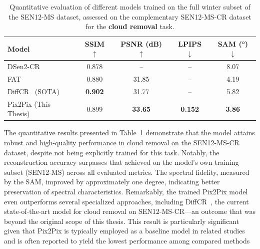 \begin{table}[h!]
    \centering
    \caption[Quantitative results on cloud removal]{Quantitative evaluation of different models trained on the full winter subset of the SEN12-MS dataset, assessed on the complementary SEN12-MS-CR dataset for the \textbf{cloud removal} task.}
    \begin{tabular}{lcccc}
        \toprule
        \textbf{Model}               & \textbf{SSIM $\uparrow$} & \textbf{PSNR (dB) $\uparrow$} & \textbf{LPIPS $\downarrow$} & \textbf{SAM (°) $\downarrow$} \\
        \midrule
        DSen2-CR~\cite{CR_SEN2_dRNN} & 0.878                    & --                            & --                          & 8.07                          \\
        FAT~\cite{c_guided_fus_s2ot} & 0.880                    & 31.85                         & --                          & 4.19                          \\
        DiffCR~\cite{DiffCR} (SOTA)  & \textbf{0.902}           & 31.77                         & --                          & 5.82                          \\
        Pix2Pix (This Thesis)        & 0.899                    & \textbf{33.65}                & \textbf{0.152}              & \textbf{3.86}                 \\
        \bottomrule
    \end{tabular}
    \label{tab:quantitative_result_cr}
\end{table}

The quantitative results presented in Table~\ref{tab:quantitative_result_cr} demonstrate that the model attains robust and high-quality performance in cloud removal on the SEN12-MS-CR dataset, despite not being explicitly trained for this task. Notably, the reconstruction accuracy surpasses that achieved on the model’s own training subset (SEN12-MS) across all evaluated metrics. The spectral fidelity, measured by the SAM, improved by approximately one degree, indicating better preservation of spectral characteristics. Remarkably, the trained Pix2Pix model even outperforms several specialized approaches, including DiffCR~\cite{DiffCR}, the current state-of-the-art model for cloud removal on SEN12-MS-CR—an outcome that was beyond the original scope of this thesis. This result is particularly significant given that Pix2Pix is typically employed as a baseline model in related studies and is often reported to yield the lowest performance among compared methods 


